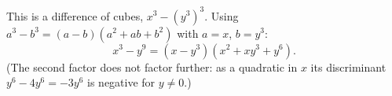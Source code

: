 This is a difference of cubes, $x^3-\left(y^3\right)^3$. Using $a^3-b^3=(a-b)\left(a^2+ab+b^2\right)$ with $a=x$, $b=y^3$:
\[x^3-y^9=\boxed{\left(x-y^3\right)\left(x^2+xy^3+y^6\right)}.\]
(The second factor does not factor further: as a quadratic in $x$ its discriminant $y^6-4y^6=-3y^6$ is negative for $y\ne0$.)
